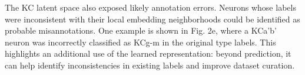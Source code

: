 \documentclass{article}
\begin{document}
The KC latent space also exposed likely annotation errors. Neurons whose labels were inconsistent with their local embedding neighborhoods could be identified as probable misannotations. One example is shown in Fig. 2e, where a KCa'b' neuron was incorrectly classified as KCg-m in the original type labels. This highlights an additional use of the learned representation: beyond prediction, it can help identify inconsistencies in existing labels and improve dataset curation.

\end{document}
